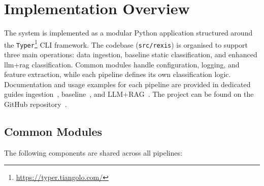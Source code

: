 \section{Implementation Overview}\label{sec:ImplementationOverview}
The system is implemented as a modular Python application structured around the
\texttt{Typer}\footnote{\url{https://typer.tiangolo.com/}} CLI framework. The codebase
(\texttt{src/rexis}) is organised to support three main operations: data ingestion, baseline static
classification, and enhanced \gls{llm}+\gls{rag} classification. Common modules handle
configuration, logging, and feature extraction, while each pipeline defines its own classification
logic. Documentation and usage examples for each pipeline are provided in dedicated guides
ingestion~\cite{rexisIngestionPipeline}, baseline~\cite{rexisBaselinePipeline}, and
LLM+RAG~\cite{rexisLLMRagPipeline}. The project can be found on the GitHub
repository~\cite{rexisRepo}.

\subsection{Common Modules}\label{subsec:CommonModules}
The following components are shared across all pipelines:

